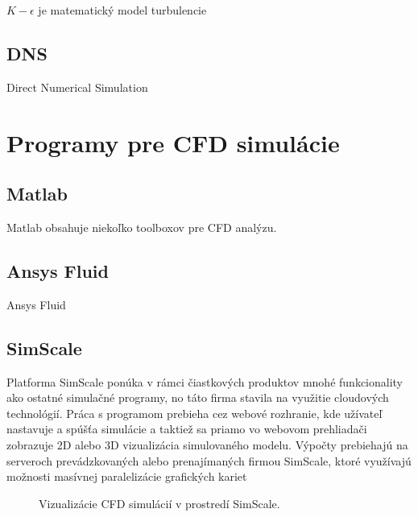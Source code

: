 \documentclass[]{tukediphc}
\begin{document}
$K-\epsilon$ je matematický model turbulencie

\subsection{DNS}

Direct Numerical Simulation

\section{Programy pre CFD simulácie}

\subsection{Matlab}
Matlab obsahuje niekoľko toolboxov pre CFD analýzu. 

\subsection{Ansys Fluid}

Ansys Fluid

\subsection{SimScale}

Platforma SimScale ponúka v rámci čiastkových produktov mnohé funkcionality ako ostatné simulačné programy, no táto firma stavila na využitie cloudových technológií. Práca s programom prebieha cez webové rozhranie, kde užívateľ nastavuje a spúšťa simulácie a taktiež sa priamo vo webovom prehliadači zobrazuje 2D alebo 3D vizualizácia simulovaného modelu. Výpočty prebiehajú na serveroch prevádzkovaných alebo prenajímaných firmou SimScale, ktoré využívajú možnosti masívnej paralelizácie grafických kariet


\begin{figure}[!ht]
	\centering
	\qquad
	\caption{Vizualizácie CFD simulácií v prostredí SimScale.}
\end{figure}
\end{document}
